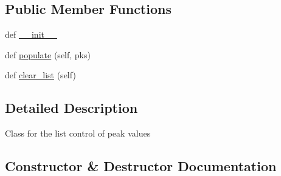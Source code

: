 \subsection*{Public Member Functions}
\begin{DoxyCompactItemize}
\item 
def \hyperlink{class_uni_dec_1_1unidec__modules_1_1_autocorr_window_1_1_corr_list_ctrl_aaba58ad894165dc191ee4435f0c3d9db}{\+\_\+\+\_\+init\+\_\+\+\_\+}
\item 
def \hyperlink{class_uni_dec_1_1unidec__modules_1_1_autocorr_window_1_1_corr_list_ctrl_aafa823c18b9fac98a7c75da6643d18df}{populate} (self, pks)
\item 
def \hyperlink{class_uni_dec_1_1unidec__modules_1_1_autocorr_window_1_1_corr_list_ctrl_a4f092cf7f936f21cd7fd973ad9f487c7}{clear\+\_\+list} (self)
\end{DoxyCompactItemize}


\subsection{Detailed Description}
\begin{DoxyVerb}Class for the list control of peak values
\end{DoxyVerb}
 

\subsection{Constructor \& Destructor Documentation}
\hypertarget{class_uni_dec_1_1unidec__modules_1_1_autocorr_window_1_1_corr_list_ctrl_aaba58ad894165dc191ee4435f0c3d9db}{}
